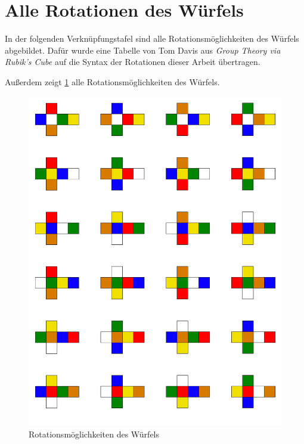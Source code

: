 \documentclass[12pt,a4paper, usenames, dvipsnames]{article}
\theoremstyle{mystyle}
\theoremstyle{definition}
\begin{document}
%
%
%
%
%
%
%
%
%
%
%
%
%
%
%
%
%
%
%
\newpage
\appendix

\section{Alle Rotationen des Würfels}
\label{Anhang_RotationenDesWürfels}

In der folgenden Verknüpfungstafel sind alle Rotationsmöglichkeiten des Würfels abgebildet. Dafür wurde eine Tabelle von Tom Davis aus \textit{Group Theory via Rubik's Cube} \cite{TD} auf die Syntax der Rotationen dieser Arbeit übertragen.

Außerdem zeigt \ref{AbbildungWürfelRotationAlleSeiten} alle Rotationsmöglichkeiten des Würfels.


\begin{figure}[H]
\centering
\includegraphics[scale=0.06]{AlleRotationen.png}
\caption{Rotationsmöglichkeiten des Würfels}
\label{AbbildungWürfelRotationAlleSeiten}
\end{figure}
\end{document}
